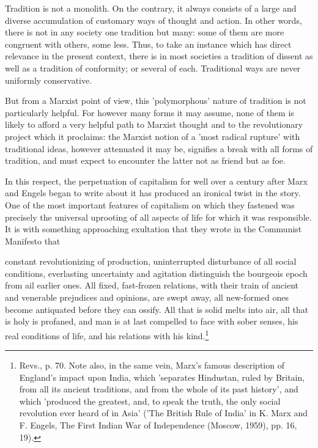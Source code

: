 Tradition is not a monolith. On the contrary, it always consists of a large and diverse accumulation of customary ways of thought and action. In other words, there is not in any society one tradition but many: some of them are more congruent with others, some less. Thus, to take an instance which has direct relevance in the present context, there is in most societies a tradition of dissent as well as a tradition of conformity; or several of each. Traditional ways are never uniformly conservative.

But from a Marxist point of view, this 'polymorphous' nature of tradition is not particularly helpful. For however many forms it may assume, none of them is likely to afford a very helpful path to Marxist thought and to the revolutionary project which it proclaims: the Marxist notion of a 'most radical rupture' with traditional ideas, however attenuated it may be, signifies a break with all forms of tradition, and must expect to encounter the latter not as friend but as foe.

In this respect, the perpetuation of capitalism for well over a century after Marx and Engels began to write about it has produced an ironical twist in the story. One of the most important features of capitalism on which they fastened was precisely the universal uprooting of all aspects of life for which it was responsible. It is with something approaching exultation that they wrote in the Communist Manifesto that

\begin{displayquote}
    constant revolutionizing of production, uninterrupted disturbance of all social conditions, everlasting uncertainty and agitation distinguish the bourgeois epoch from ail earlier ones. All fixed, fast-frozen relations, with their train of ancient and venerable prejudices and opinions, are swept away, all new-formed ones become antiquated before they can ossify. All that is solid melts into air, all that is holy is profaned, and man is at last compelled to face with sober senses, his real conditions of life, and his relations with his kind.\footnote{Revs., p. 70. Note also, in the same vein, Marx's famous description of England's impact upon India, which 'separates Hindustan, ruled by Britain, from all its ancient traditions, and from the whole of its past history', and which 'produced the greatest, and, to speak the truth, the only social revolution ever heard of in Asia' ('The British Rule of India' in K. Marx and F. Engels, The First Indian War of Independence (Moscow, 1959), pp. 16, 19).}
\end{displayquote}

